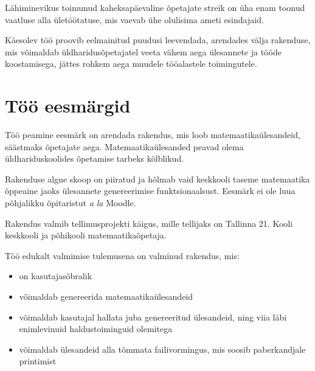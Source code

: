 Lähiminevikus toimunud kaheksapäevaline õpetajate streik \cite{hm-opetajate-streik} on üha enam toonud vaatluse alla ületöötatuse, mis vaevab ühe olulisima ameti esindajaid.

Käesolev töö proovib eelmainitud puudusi leevendada, arendades välja rakenduse, mis võimaldab üldharidusõpetajatel veeta vähem aega ülesannete ja tööde koostamisega, jättes rohkem aega muudele tööalastele toimingutele.

\section{Töö eesmärgid}

Töö peamine eesmärk on arendada rakendus, mis loob matemaatikaülesandeid, säästmaks õpetajate aega. Matemaatikaülesanded peavad olema üldhariduskoolides õpetamise tarbeks kõlblikud.

Rakenduse algne skoop on piiratud ja hõlmab vaid keskkooli taseme matemaatika õppeaine jaoks ülesannete genereerimise funktsionaalsust. Eesmärk ei ole luua põhjalikku õpitaristut \textit{a la} Moodle.

Rakendus valmib tellimusprojekti käigus, mille tellijaks on Tallinna 21. Kooli keskkooli ja põhikooli matemaatikaõpetaja.

Töö edukalt valmimise tulemusena on valminud rakendus, mis:

\begin{itemize}
  \item on kasutajasõbralik
  \item võimaldab genereerida matemaatikaülesandeid
  \item võimaldab kasutajal hallata juba genereeritud ülesandeid, ning viia läbi enimlevinuid haldustoiminguid olemitega
  \item võimaldab ülesandeid alla tõmmata failivormingus, mis soosib paberkandjale printimist
\end{itemize}

